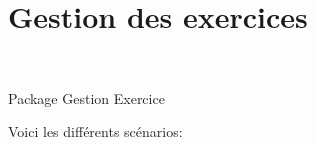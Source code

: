 \section{Gestion des exercices}

\begin{center}
\\
\par{Package Gestion Exercice}
\end{center}
Voici les diff{\'e}rents sc{\'e}narios:\\

